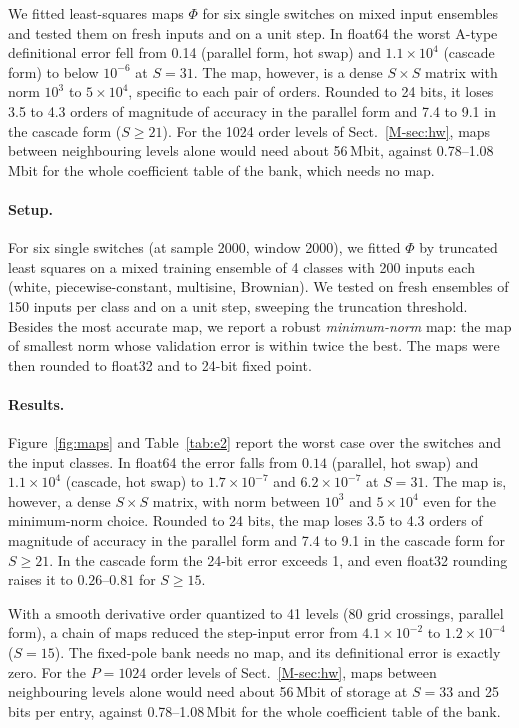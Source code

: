 We fitted least-squares maps $\Phi$ for six single switches on mixed input ensembles and tested them on fresh inputs and on a unit step. In float64 the worst A-type definitional error fell from 0.14 (parallel form, hot swap) and $1.1\times10^4$ (cascade form) to below $10^{-6}$ at $S=31$. The map, however, is a dense $S\times S$ matrix with norm $10^3$ to $5\times10^4$, specific to each pair of orders. Rounded to 24 bits, it loses 3.5 to 4.3 orders of magnitude of accuracy in the parallel form and 7.4 to 9.1 in the cascade form ($S\ge21$). For the 1024 order levels of Sect.~\ref{M-sec:hw}, maps between neighbouring levels alone would need about 56\,Mbit, against 0.78--1.08\,Mbit for the whole coefficient table of the bank, which needs no map.



\paragraph{Setup.} For six single switches (at sample 2000, window 2000), we fitted $\Phi$ by truncated least squares on a mixed training ensemble of 4 classes with 200 inputs each (white, piecewise-constant, multisine, Brownian). We tested on fresh ensembles of 150 inputs per class and on a unit step, sweeping the truncation threshold. Besides the most accurate map, we report a robust \emph{minimum-norm} map: the map of smallest norm whose validation error is within twice the best. The maps were then rounded to float32 and to 24-bit fixed point.

\paragraph{Results.} Figure~\ref{fig:maps} and Table~\ref{tab:e2} report the worst case over the switches and the input classes. In float64 the error falls from $0.14$ (parallel, hot swap) and $1.1\times10^4$ (cascade, hot swap) to $1.7\times10^{-7}$ and $6.2\times10^{-7}$ at $S=31$. The map is, however, a dense $S\times S$ matrix, with norm between $10^3$ and $5\times10^4$ even for the minimum-norm choice. Rounded to 24 bits, the map loses 3.5 to 4.3 orders of magnitude of accuracy in the parallel form and 7.4 to 9.1 in the cascade form for $S\ge21$. In the cascade form the 24-bit error exceeds 1, and even float32 rounding raises it to $0.26$--$0.81$ for $S\ge15$.

With a smooth derivative order quantized to 41 levels (80 grid crossings, parallel form), a chain of maps reduced the step-input error from $4.1\times10^{-2}$ to $1.2\times10^{-4}$ ($S=15$). The fixed-pole bank needs no map, and its definitional error is exactly zero. For the $P=1024$ order levels of Sect.~\ref{M-sec:hw}, maps between neighbouring levels alone would need about 56\,Mbit of storage at $S=33$ and 25 bits per entry, against 0.78--1.08\,Mbit for the whole coefficient table of the bank.

